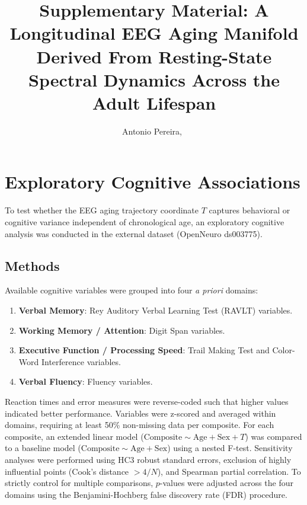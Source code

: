 \documentclass[journal]{IEEEtran}
\begin{document}
\title{Supplementary Material: A Longitudinal EEG Aging Manifold Derived From Resting-State Spectral Dynamics Across the Adult Lifespan}

\author{Antonio Pereira,~}

\maketitle

\section{Exploratory Cognitive Associations}

To test whether the EEG aging trajectory coordinate $T$ captures behavioral or cognitive variance independent of chronological age, an exploratory cognitive analysis was conducted in the external dataset (OpenNeuro ds003775).

\subsection{Methods}
Available cognitive variables were grouped into four \textit{a priori} domains:
\begin{enumerate}
    \item \textbf{Verbal Memory}: Rey Auditory Verbal Learning Test (RAVLT) variables.
    \item \textbf{Working Memory / Attention}: Digit Span variables.
    \item \textbf{Executive Function / Processing Speed}: Trail Making Test and Color-Word Interference variables.
    \item \textbf{Verbal Fluency}: Fluency variables.
\end{enumerate}

Reaction times and error measures were reverse-coded such that higher values indicated better performance. Variables were z-scored and averaged within domains, requiring at least 50\% non-missing data per composite. For each composite, an extended linear model ($\text{Composite} \sim \text{Age} + \text{Sex} + T$) was compared to a baseline model ($\text{Composite} \sim \text{Age} + \text{Sex}$) using a nested F-test. Sensitivity analyses were performed using HC3 robust standard errors, exclusion of highly influential points (Cook's distance $> 4/N$), and Spearman partial correlation. To strictly control for multiple comparisons, $p$-values were adjusted across the four domains using the Benjamini-Hochberg false discovery rate (FDR) procedure.
\end{document}
